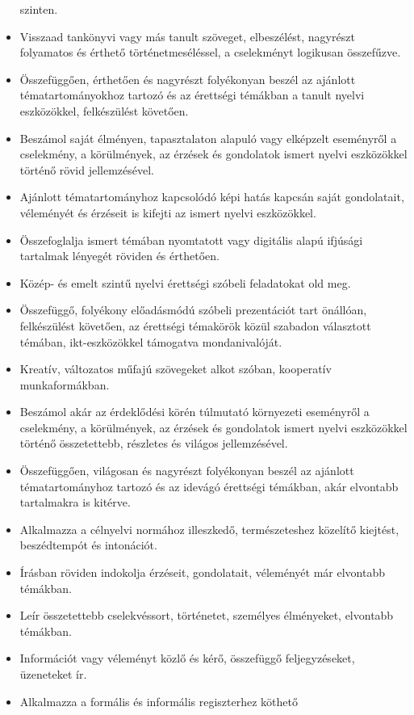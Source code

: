 \begin{itemize}
  szinten.
\item
  Visszaad tankönyvi vagy más tanult szöveget, elbeszélést, nagyrészt
  folyamatos és érthető történetmeséléssel, a cselekményt logikusan
  összefűzve.
\item
  Összefüggően, érthetően és nagyrészt folyékonyan beszél az ajánlott
  tématartományokhoz tartozó és az érettségi témákban a tanult nyelvi
  eszközökkel, felkészülést követően.
\item
  Beszámol saját élményen, tapasztalaton alapuló vagy elképzelt
  eseményről a cselekmény, a körülmények, az érzések és gondolatok
  ismert nyelvi eszközökkel történő rövid jellemzésével.
\item
  Ajánlott tématartományhoz kapcsolódó képi hatás kapcsán saját
  gondolatait, véleményét és érzéseit is kifejti az ismert nyelvi
  eszközökkel.
\item
  Összefoglalja ismert témában nyomtatott vagy digitális alapú ifjúsági
  tartalmak lényegét röviden és érthetően.
\item
  Közép- és emelt szintű nyelvi érettségi szóbeli feladatokat old meg.
\item
  Összefüggő, folyékony előadásmódú szóbeli prezentációt tart önállóan,
  felkészülést követően, az érettségi témakörök közül szabadon
  választott témában, ikt-eszközökkel támogatva mondanivalóját.
\item
  Kreatív, változatos műfajú szövegeket alkot szóban, kooperatív
  munkaformákban.
\item
  Beszámol akár az érdeklődési körén túlmutató környezeti eseményről a
  cselekmény, a körülmények, az érzések és gondolatok ismert nyelvi
  eszközökkel történő összetettebb, részletes és világos jellemzésével.
\item
  Összefüggően, világosan és nagyrészt folyékonyan beszél az ajánlott
  tématartományhoz tartozó és az idevágó érettségi témákban, akár
  elvontabb tartalmakra is kitérve.
\item
  Alkalmazza a célnyelvi normához illeszkedő, természeteshez közelítő
  kiejtést, beszédtempót és intonációt.
\item
  Írásban röviden indokolja érzéseit, gondolatait, véleményét már
  elvontabb témákban.
\item
  Leír összetettebb cselekvéssort, történetet, személyes élményeket,
  elvontabb témákban.
\item
  Információt vagy véleményt közlő és kérő, összefüggő feljegyzéseket,
  üzeneteket ír.
\item
  Alkalmazza a formális és informális regiszterhez köthető

\end{itemize}
